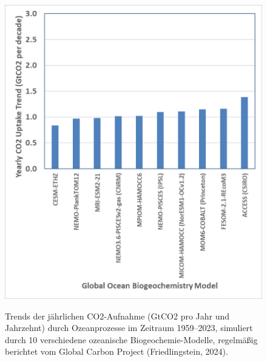 \documentclass[12pt,paper=a4,DIV=12,parskip=never,chapterprefix=false,headings=standardclasses]{scrreprt}
\numberwithin{figure}{chapter}
\begin{document}
\begin{figure}[H]
\begin{center}
\includegraphics[width=1.0\textwidth]{bilder/bilderKlima-0015.png}\\[1cm]
\end{center}
\caption{Trends der jährlichen CO2-Aufnahme (GtCO2 pro Jahr und Jahrzehnt) durch Ozeanprozesse im Zeitraum
1959–2023, simuliert durch 10 verschiedene ozeanische Biogeochemie-Modelle, regelmäßig berichtet vom
Global Carbon Project (Friedlingstein, 2024).}
\end{figure}
\end{document}
